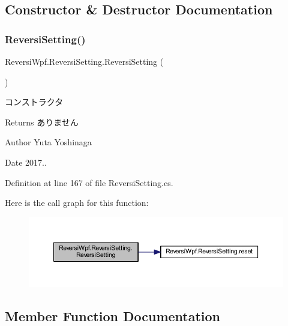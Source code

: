 \subsection{Constructor \& Destructor Documentation}
\mbox{\label{class_reversi_wpf_1_1_reversi_setting_acc35415380efbe8facc60fb8c4c443dd}} 
\subsubsection{\texorpdfstring{Reversi\+Setting()}{ReversiSetting()}}
{\footnotesize\ttfamily Reversi\+Wpf.\+Reversi\+Setting.\+Reversi\+Setting (\begin{DoxyParamCaption}{ }\end{DoxyParamCaption})}



コンストラクタ 

\begin{DoxyReturn}{Returns}
ありません 
\end{DoxyReturn}
\begin{DoxyAuthor}{Author}
Yuta Yoshinaga 
\end{DoxyAuthor}
\begin{DoxyDate}{Date}
2017.. 
\end{DoxyDate}


Definition at line 167 of file Reversi\+Setting.\+cs.

Here is the call graph for this function\+:
\nopagebreak
\begin{figure}[H]
\begin{center}
\leavevmode
\includegraphics[width=350pt]{class_reversi_wpf_1_1_reversi_setting_acc35415380efbe8facc60fb8c4c443dd_cgraph}
\end{center}
\end{figure}


\subsection{Member Function Documentation}
\mbox{\label{class_reversi_wpf_1_1_reversi_setting_a62057d7ef379815b2e55f8543d3de080}} 
